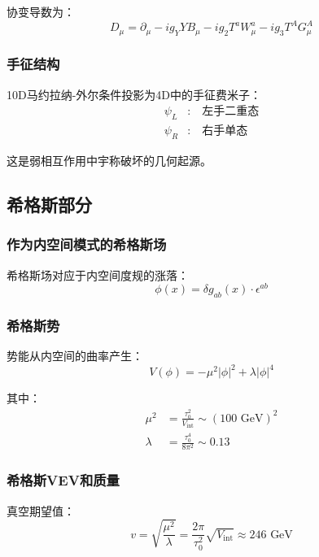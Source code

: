 协变导数为：
\begin{equation}
    D_\mu = \partial_\mu - ig_Y Y B_\mu - ig_2 T^a W_\mu^a - ig_3 T^A G_\mu^A
\end{equation}

\subsubsection{手征结构}

10D马约拉纳-外尔条件投影为4D中的手征费米子：
\begin{align}
    \psi_L &: \quad \text{左手二重态} \\
    \psi_R &: \quad \text{右手单态}
\end{align}

这是弱相互作用中宇称破坏的几何起源。

\subsection{希格斯部分}

\subsubsection{作为内空间模式的希格斯场}

希格斯场对应于内空间度规的涨落：
\begin{equation}
    \phi(x) = \delta g_{ab}(x) \cdot \epsilon^{ab}
\end{equation}

\subsubsection{希格斯势}

势能从内空间的曲率产生：
\begin{equation}
    V(\phi) = -\mu^2|\phi|^2 + \lambda|\phi|^4
\end{equation}

其中：
\begin{align}
    \mu^2 &= \frac{\tau_0^2}{V_{\text{int}}} \sim (100 \text{ GeV})^2 \\
    \lambda &= \frac{\tau_0^4}{8\pi^2} \sim 0.13
\end{align}

\subsubsection{希格斯VEV和质量}

真空期望值：
\begin{equation}
    v = \sqrt{\frac{\mu^2}{\lambda}} = \frac{2\pi}{\tau_0^2}\sqrt{V_{\text{int}}} \approx 246 \text{ GeV}
\end{equation}

